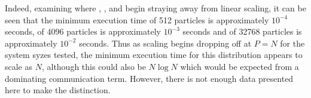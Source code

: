 Indeed, examining where
,
,
 and
begin straying away from linear scaling,
it can be seen that the minimum execution time
of 512 particles is approximately $10^{-4}$ seconds,
of 4096 particles is approximately $10^{-3}$ seconds and
of 32768 particles is approximately $10^{-2}$ seconds.
%
Thus as scaling begins dropping off at $P = N$ for the system syzes tested,
the minimum execution time for this distribution appears to scale as $N$,
although this could also be $N\log{N}$ which would be expected from
a dominating communication term.
%
However, there is not enough data presented here to make the distinction.

